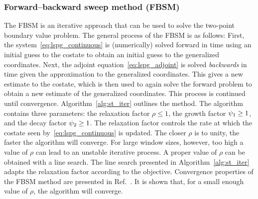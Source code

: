 \subsubsection{Forward--backward sweep method (FBSM)}\label{sec:FBSM}


The FBSM is an iterative approach that can be used to
solve the two-point boundary value problem. The general process of the FBSM is
as follows: First, the system~\eqref{eq:lspg_continuous} is (numerically) solved forward in
time using an initial guess to the costate to obtain an initial guess to
the generalized coordinates. Next, the adjoint equation~\eqref{eq:lspg_adjoint} is solved \textit{backwards} in time given the
approximation to the generalized coordinates. This gives a new estimate to the
costate, which is then used to again solve the forward problem to obtain
a new estimate of the generalized coordinates. This process is continued until
convergence. Algorithm~\ref{alg:st_iter} outlines the method. The algorithm
contains three parameters: the relaxation factor $\rho \le 1$, the growth factor
$\psi_1 \ge 1$, and the decay factor $\psi_2 \ge 1$. The relaxation factor controls the rate at which the costate seen by~\eqref{eq:lspg_continuous} is updated. The
closer $\rho$ is to unity, the faster the algorithm will converge.
For large window sizes, however, too high a value of $\rho$ can lead to an unstable iterative process. 
A proper value of $\rho$ can be
obtained with a line search. The line search presented in Algorithm~\ref{alg:st_iter} adapts the relaxation factor
according to the objective. Convergence properties of the FBSM method are
presented in Ref.~\cite{McAsey2012ConvergenceOT}. It is shown that, for a small 
enough value of $\rho$, the algorithm will converge.

